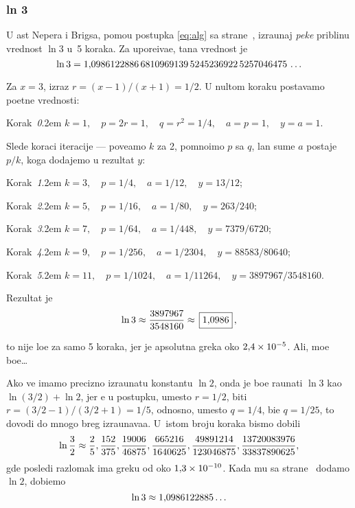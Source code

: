 \subsubsection{ln 3}\label{sssec:ln3}
 
\zadatak
U {\cv}ast Nepera i Brigsa,
pomo{\cc}u postupka \eqref{eq:alg} sa 
strane~\pageref{eq:alg},
izra{\cv}unaj {\sl pe{\sv}ke\/} pribli{\zv}nu vrednost $\ln 3$
u~5 koraka. Za upore{\dj}iva{\nj}e, ta{\cv}na vrednost je
$$
\ln3=1\.
0986122886\,
6810969139\,
5245236922\,
5257046475\,\ldots
$$

\def\step#1{\par\smallskip\indent\leavevmode
  Korak~{\it#1}.\kern2em\relax}

\resenje
Za $x=3$, izraz $r=(x-1)/(x+1)=1/2$. U nultom koraku postav{\lj}amo po{\cv}etne vrednosti:
\step0 $k=1,\quad p=2r=1,\quad q=r^2=1/4,\quad a=p=1,\quad y=a=1$.

\smallskip
\noindent Slede koraci iteracije --- pove{\cc}amo $k$ za 2, pomno{\zv}imo $p$ sa $q$,
{\cv}lan sume $a$ postaje $p/k$, koga dodajemo u rezultat $y$:

\step1 $k=3,\quad p=1/4,\quad a=1/12,\quad y=13/12$;
\step2 $k=5,\quad p=1/16,\quad a=1/80,\quad y=263/240$;
\step3 $k=7,\quad p=1/64,\quad a=1/448,\quad y=7379/6720$;
\step4 $k=9,\quad p=1/256,\quad a=1/2304,\quad y=88583/80640$;
\step5 $k=11,\quad p=1/1024,\quad a=1/11264,\quad y=3897967/3548160$.

\medskip
\noindent Rezultat je
$$
\ln3\approx\frac{3897967}{3548160}\approx \ram{1\.0986},
$$

\smallskip\noindent
{\sv}to nije lo{\sv}e za samo 5 koraka, jer je apsolutna gre{\sv}ka oko $2\.4\puta10^{-5}$.
Ali, mo{\zv}e bo{\lj}e\dots

\iffalse
Da smo ra{\cv}unali u 20 koraka, 
dobili bi smo $\ln3\approx\frac{636083906982236368109838473}{578988523561291667944243200}$, 
gre{\sv}ka bi bila oko $7\puta10^{-15}$, {\sv}to je preciznost s kojom je 1617.\ godine Brigs
izra{\cv}unao svoje prve logaritamske tablice.
\fi

\dodatak
Ako ve{\cc} imamo precizno izra{\cv}unatu konstantu $\ln2$, onda je bo{\lj}e ra{\cv}unati $\ln3$ kao $\ln(3/2)+\ln2$,
jer {\cc}e u postupku, umesto $r=1/2$, biti $r=(3/2-1)/(3/2+1)=1/5$, 
odnosno, umesto $q=1/4$, bi{\cc}e $q=1/25$,
{\sv}to dovodi do mnogo br{\zv}eg izra{\cv}unava{\nj}a. U~istom broju koraka bismo dobili
$$
\ln\frac32\approx
\ff2/5, \ff152/375, \ff19006/46875, \ff665216/1640625, \ff49891214/123046875, 
\ff13720083976/33837890625,
$$
gde posled{\nj}i razlomak ima gre{\sv}ku od oko $1\.3\puta10^{-10}$.
Kada mu sa strane~\pageref{ln2} dodamo $\ln2$, dobi{\cc}emo
$$\ln3\approx1\.0986122885\ldots$$

